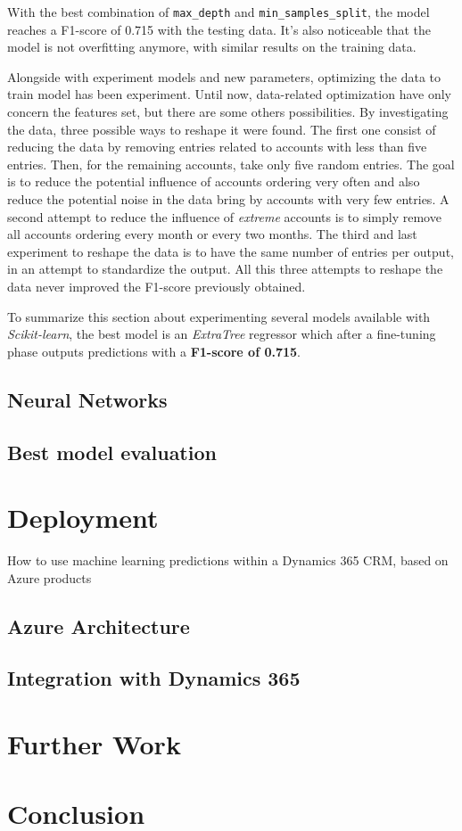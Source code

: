 With the best combination of \texttt{max\_depth} and \texttt{min\_samples\_split}, the model reaches a F1-score of 0.715 with the testing data. It's also noticeable that the model is not overfitting anymore, with similar results on the training data.


Alongside with experiment models and new parameters, optimizing the data to train model has been experiment. Until now, data-related optimization have only concern the features set, but there are some others possibilities. By investigating the data, three possible ways to reshape it were found. 
The first one consist of reducing the data by removing entries related to accounts with less than five entries. Then, for the remaining accounts, take only five random entries. The goal is to reduce the potential influence of accounts ordering very often and also reduce the potential noise in the data bring by accounts with very few entries. A second attempt to reduce the influence of \textit{extreme} accounts is to simply remove all accounts ordering every month or every two months. The third and last experiment to reshape the data is to have the same number of entries per output, in an attempt to standardize the output. All this three attempts to reshape the data never improved the F1-score previously obtained.

To summarize this section about experimenting several models available with \textit{Scikit-learn}, the best model is an \textit{ExtraTree} regressor which after a fine-tuning phase outputs predictions with a \textbf{F1-score of 0.715}.

\subsection{Neural Networks}

\subsection{Best model evaluation}


\section{Deployment} \label{sec:crm-deployment}
How to use machine learning predictions within a Dynamics 365 CRM, based on Azure products

\subsection{Azure Architecture}

\subsection{Integration with Dynamics 365}


\section{Further Work} \label{sec:use-case-further-work}

\section{Conclusion} \label{sec:use-case-conclusion}